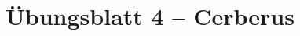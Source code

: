 \documentclass{scrartcl}
\begin{document}
    \setlength{\parindent}{0em}

    \section*{Übungsblatt 4 -- Cerberus}

	
\end{document}
